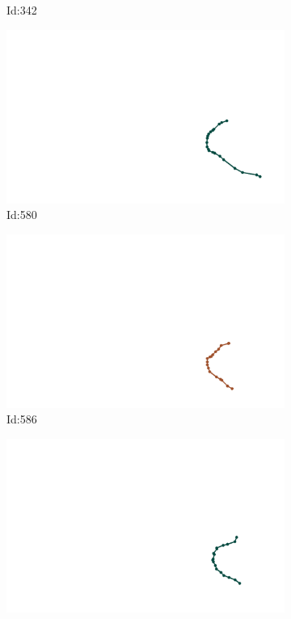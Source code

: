 \documentclass[12pt,twoside]{report}
\begin{document}
\begin{figure}
\begin{subfigure}[b]{0.20\textwidth}
\caption{Id:342}
\end{subfigure}
\begin{subfigure}[b]{0.20\textwidth}
\centering
\includegraphics[width=\textwidth]{../../trajectories/580.png}
\caption{Id:580}
\end{subfigure}
\begin{subfigure}[b]{0.20\textwidth}
\centering
\includegraphics[width=\textwidth]{../../trajectories/586.png}
\caption{Id:586}
\end{subfigure}
\begin{subfigure}[b]{0.20\textwidth}
\centering
\includegraphics[width=\textwidth]{../../trajectories/720.png}

\end{subfigure}
\end{figure}
\end{document}
